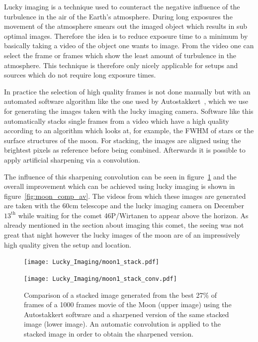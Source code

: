 \documentclass{article}
\begin{document}
Lucky imaging is a technique used to counteract the negative influence of the turbulence in the air of the Earth's atmosphere. During long exposures the movement of the atmosphere smears out the imaged object which results in sub optimal images. Therefore the idea is to reduce exposure time to a minimum by basically taking a video of the object one wants to image. From the video one can select the frame or frames which show the least amount of turbulence in the atmosphere. This technique is therefore only nicely applicable for setups and sources which do not require long exposure times.

In practice the selection of high quality frames is not done manually but with an automated software algorithm like the one used by Autostakkert~\parencite{autostakkert}, which we use for generating the images taken with the lucky imaging camera. Software like this automatically stacks single frames from a video which have a high quality according to an algorithm which looks at, for example, the FWHM of stars or the surface structures of the moon. For stacking, the images are aligned using the brightest pixels as reference before being combined. Afterwards it is possible to apply artificial sharpening via a convolution. 

The influence of this sharpening convolution can be seen in figure~\ref{fig:moon_comp_sharp} and the overall improvement which can be achieved using lucky imaging is shown in figure~\ref{fig:moon_comp_av}. The videos from which these images are generated are taken with the 60cm telescope and the lucky imaging camera on December $13^\text{th}$ while waiting for the comet 46P/Wirtanen to appear above the horizon. As already mentioned in the section about imaging this comet, the seeing was not great that night however the lucky images of the moon are of an impressively high quality given the setup and location. 

\begin{figure}[H]
\centering
\begin{minipage}{1.\textwidth}
\centering
  \texttt{[image: Lucky\_Imaging/moon1\_stack.pdf]}
\end{minipage}
\begin{minipage}{1.\textwidth}
\centering
  \texttt{[image: Lucky\_Imaging/moon1\_stack\_conv.pdf]}
\end{minipage}
    \caption{Comparison of a stacked image generated from the best 27\% of frames of a 1000 frames movie of the Moon (upper image) using the Autostakkert software \parencite{autostakkert} and a sharpened version of the same stacked image (lower image). An automatic convolution is applied to the stacked image in order to obtain the sharpened version.} 
    \label{fig:moon_comp_sharp}
\end{figure}
\end{document}
